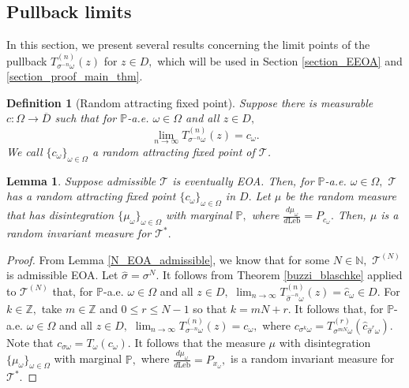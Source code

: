 \documentclass[12pt,reqno]{amsart}
\numberwithin{theorem}{section}
\newtheorem{definition}[theorem]{Definition}%
\newtheorem{lemma}[theorem]{Lemma}
\begin{document}
\subsection{Pullback limits}\label{section_rfp}

In this section, we present several results concerning the limit points of the pullback $T_{\sigma^{-n}\omega}^{(n)}(z)$ for $z\in D,$ which will be used in Section \ref{section_EEOA} and \ref{section_proof_main_thm}.

\begin{definition}[Random attracting fixed point]
    Suppose there is measurable $c:\Omega\to\overline{D}$ such that for $\mathbb{P}$-a.e. $\omega\in\Omega$ and all $z\in D,$ $$\lim_{n\to\infty}T_{\sigma^{-n}\omega}^{(n)}(z)=c_{\omega}.$$ We call $\{c_{\omega}\}_{\omega\in\Omega}$ a random attracting fixed point of $\mathcal{T}$. 
\end{definition}

\begin{lemma}\label{N_admissible_rfp}
    Suppose admissible $\mathcal{T}$ is eventually EOA. Then, for $\mathbb{P}$-a.e. $\omega\in\Omega,$ $\mathcal{T}$ has a random attracting fixed point $\{c_{\omega}\}_{\omega\in\Omega}$ in $D.$   Let $\mu$ be the random measure that has disintegration $\{\mu_{\omega}\}_{\omega\in\Omega}$ with marginal $\mathbb{P},$ where $\frac{d\mu_{\omega}}{d\text{Leb}}=P_{c_{\omega}}.$ Then, $\mu$ is a random invariant measure for $\mathcal{T}^{*}.$
\end{lemma}
\begin{proof}
From Lemma \ref{N_EOA_admissible}, we know that for some $N\in\mathbb{N},$ $\mathcal{T}^{(N)}$ is admissible EOA. Let $\hat{\sigma}=\sigma^{N}.$ It follows from Theorem \ref{buzzi_blaschke} applied to $\mathcal{T}^{(N)}$ that, for $\mathbb{P}$-a.e. $\omega\in\Omega$ and all $z\in D,$ $\lim_{n\to\infty}T_{\hat{\sigma}^{-n}\omega}^{(n)}(z)=\hat{c}_{\omega}\in D.$ For $k\in\mathbb{Z},$ take $m\in\mathbb{Z}$ and $0\le r\le N-1$ so that $k=mN+r.$ It follows that, for $\mathbb{P}$-a.e. $\omega\in\Omega$ and all $z\in D,$ $\lim_{n\to\infty}T_{\sigma^{-n}\omega}^{(n)}(z)=c_{\omega},$  where $c_{\sigma^{k}\omega}=T_{\sigma^{mN}\omega}^{(r)}(\hat{c}_{\hat{\sigma}^{r}\omega}).$
Note that $c_{\sigma\omega}=T_{\omega}(c_{\omega}).$ It follows that the measure $\mu$ with disintegration $\{\mu_{\omega}\}_{\omega\in\Omega}$ with marginal $\mathbb{P},$ where $\frac{d\mu_{\omega}}{d\text{Leb}}=P_{x_{\omega}},$ is a random invariant measure for $\mathcal{T}^{*}.$
\end{proof}
\end{document}
